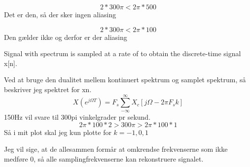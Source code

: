 \begin{Opgaver}
\begin{kapitel}
\begin{Opgave}
            \begin{UnderOpgave}[Gentag for Fs = 500Hz]
                \[2 * 300\pi < 2\pi * 500\]
                Det er den, så der sker ingen aliasing
            \end{UnderOpgave}
            \begin{UnderOpgave}[Gentag for Fs = 100Hz]
                \[2 * 300\pi < 2\pi * 100\]
                Den gælder ikke og derfor er der aliasing
            \end{UnderOpgave}
        \end{Opgave}

        \begin{Opgave}
            Signal  with spectrum  
            is sampled at a rate of  to obtain the discrete-time signal x[n].
            \begin{UnderOpgave}
                Ved at bruge den dualitet mellem kontinuert spektrum og samplet spektrum, så beskriver jeg spektret for xn. 
                \[X(e^{j\Omega T}) = F_s\sum_{-\infty}^{\infty}{X_c[j\Omega - 2\pi F_s k]}\]
                150Hz vil svare til 300pi vinkelgrader pr sekund. 
                \[2\pi*100*2 > 300\pi > 2\pi*100*1\]
                Så i mit plot skal jeg kun plotte for $k = -1, 0, 1$
                \vspace{100pt}                
            \end{UnderOpgave}
            \begin{UnderOpgave}[Gentag for Fs = 50Hz]
            \end{UnderOpgave}

            \begin{UnderOpgave}[Gentag for Fs = 25Hz]
                \vspace{78pt}
            \end{UnderOpgave}
            \begin{UnderOpgave}
                Jeg vil sige, at de allesammen formår at omkrendse frekvenserne som ikke medføre 0, så alle samplingfrekvenserne kan rekonstruere signalet.
                

\end{UnderOpgave}
\end{Opgave}
\end{kapitel}
\end{Opgaver}
